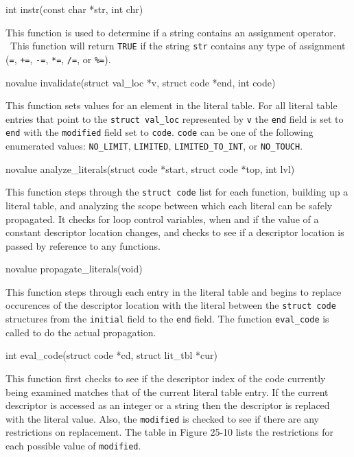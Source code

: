 {\ttfamily\mdseries
int instr(const char *str, int chr)}


This function is used to determine if a string contains an assignment
operator. \ This function will return \texttt{TRUE} if the string
\texttt{str} contains any type of assignment (\texttt{=}, \texttt{+=},
\texttt{{}-=}, \texttt{*=}, \texttt{/=}, or \texttt{\%=}).

{\ttfamily\mdseries
novalue invalidate(struct val\_loc *v, struct code *end, int code)}


This function sets values for an element in the literal table. For all
literal table entries that point to the \texttt{struct val\_loc}
represented by \texttt{v} the \texttt{end} field is set to
\texttt{end} with the \texttt{modified} field set to
\texttt{code}. \texttt{code} can be one of the following enumerated
values: \texttt{NO\_LIMIT}, \texttt{LIMITED},
\texttt{LIMITED\_TO\_INT}, or \texttt{NO\_TOUCH}.

{\ttfamily\mdseries
novalue analyze\_literals(struct code *start, struct code *top, int lvl)}


This function steps through the \texttt{struct code} list for each
function, building up a literal table, and analyzing the scope between
which each literal can be safely propagated. It checks for loop
control variables, when and if the value of a constant descriptor
location changes, and checks to see if a descriptor location is passed
by reference to any functions.

{\ttfamily\mdseries
novalue propagate\_literals(void)}


This function steps through each entry in the literal table and begins
to replace occurences of the descriptor location with the literal
between the \texttt{struct code} structures from the \texttt{initial}
field to the \texttt{end} field.  The function \texttt{eval\_code} is
called to do the actual propagation.

{\ttfamily\mdseries
int eval\_code(struct code *cd, struct lit\_tbl *cur)}


This function first checks to see if the descriptor index of the code
currently being examined matches that of the current literal table
entry. If the current descriptor is accessed as an integer or a string
then the descriptor is replaced with the literal value. Also, the
\texttt{modified} is checked to see if there are any restrictions on
replacement. The table in Figure 25-10 lists the restrictions for
each possible value of \texttt{modified}.

